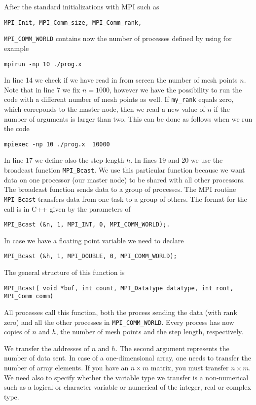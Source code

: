 After the standard initializations with MPI such as
\begin{lstlisting}
MPI_Init, MPI_Comm_size, MPI_Comm_rank,
\end{lstlisting}
\lstinline{MPI_COMM_WORLD} contains now the number of processes
defined  by using for example 
\begin{verbatim}
mpirun -np 10 ./prog.x
\end{verbatim}
In line 14 we check if
we have read in from screen the number of mesh points  $n$. Note that in line 7 we fix $n=1000$, however
we have the possibility to run the code with a different number of mesh points as well.
If \lstinline{my_rank} equals zero, which correponds to the master node, then we read a new value of
$n$  if the number of arguments is larger than two. This can be done as follows when we run the code
\begin{svgraybox}
\begin{verbatim}
mpiexec -np 10 ./prog.x  10000
\end{verbatim}
\end{svgraybox}
In line 17 we define also the step length $h$.
In lines 19 and 20 we use the broadcast function \lstinline{MPI_Bcast}.
We use this particular function because we want data on one processor (our master node) to be shared
with all other processors. The broadcast function sends data to a group of processes. 
The MPI routine \lstinline{MPI_Bcast} transfers data from one task to a group of others. 
The format for the call
is in C++ given by the parameters of 
\begin{lstlisting}
MPI_Bcast (&n, 1, MPI_INT, 0, MPI_COMM_WORLD);.
\end{lstlisting}
In case we have a floating point variable we need to declare
\begin{lstlisting}
MPI_Bcast (&h, 1, MPI_DOUBLE, 0, MPI_COMM_WORLD);
\end{lstlisting}
The general structure of this function is 
\begin{lstlisting}
MPI_Bcast( void *buf, int count, MPI_Datatype datatype, int root, MPI_Comm comm)
\end{lstlisting}
All processes call this function, both the process sending the data (with rank zero) and all the other
processes in \lstinline{MPI_COMM_WORLD}.  
Every process has now  copies of $n$ and $h$, the number of mesh points and the step length, respectively.

We transfer the addresses of $n$ and $h$.  The second argument represents the number of data sent. In case of 
a one-dimensional array, one needs to transfer the number of array elements. 
If you have an $n\times m$ matrix, you must transfer $n\times m$. We need also to specify whether the variable
type we transfer is a non-numerical such as a logical or character variable or numerical of the integer,
real or complex type. 


